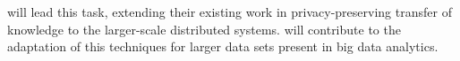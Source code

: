 \begin{Workpackage}{\thewpno}
\begin{Task}
 \SCCHshort{} will lead this task, extending their existing work in privacy-preserving transfer of knowledge to the larger-scale distributed systems. \UODshort{} will contribute to the adaptation of this techniques for larger data sets present in big data analytics. 
 \end{Task}

  
 

\end{Workpackage}

